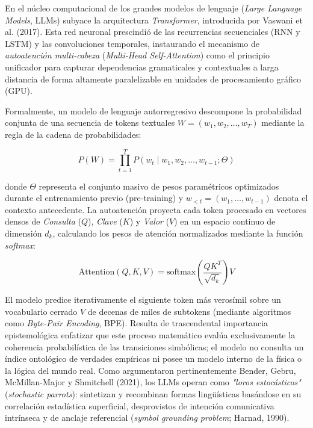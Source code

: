En el núcleo computacional de los grandes modelos de lenguaje (\textit{Large Language Models}, LLMs) subyace la arquitectura \textit{Transformer}, introducida por Vaswani et al. (2017). Esta red neuronal prescindió de las recurrencias secuenciales (RNN y LSTM) y las convoluciones temporales, instaurando el mecanismo de \textit{autoatención multi-cabeza} (\textit{Multi-Head Self-Attention}) como el principio unificador para capturar dependencias gramaticales y contextuales a larga distancia de forma altamente paralelizable en unidades de procesamiento gráfico (GPU).

Formalmente, un modelo de lenguaje autorregresivo descompone la probabilidad conjunta de una secuencia de tokens textuales $W = (w_1, w_2, \dots, w_T)$ mediante la regla de la cadena de probabilidades:

\begin{equation}
P(W) = \prod_{t=1}^T P(w_t \mid w_1, w_2, \dots, w_{t-1}; \Theta)
\end{equation}

\noindent donde $\Theta$ representa el conjunto masivo de pesos paramétricos optimizados durante el entrenamiento previo (pre-training) y $w_{<t} = (w_1, \dots, w_{t-1})$ denota el contexto antecedente. La autoatención proyecta cada token procesado en vectores densos de \textit{Consulta} ($Q$), \textit{Clave} ($K$) y \textit{Valor} ($V$) en un espacio continuo de dimensión $d_k$, calculando los pesos de atención normalizados mediante la función \textit{softmax}:

\begin{equation}
\text{Attention}(Q, K, V) = \text{softmax}\left(\frac{QK^T}{\sqrt{d_k}}\right)V
\end{equation}

El modelo predice iterativamente el siguiente token más verosímil sobre un vocabulario cerrado $V$ de decenas de miles de subtokens (mediante algoritmos como \textit{Byte-Pair Encoding}, BPE). Resulta de trascendental importancia epistemológica enfatizar que este proceso matemático evalúa exclusivamente la coherencia probabilística de las transiciones simbólicas; el modelo no consulta un índice ontológico de verdades empíricas ni posee un modelo interno de la física o la lógica del mundo real. Como argumentaron pertinentemente Bender, Gebru, McMillan-Major y Shmitchell (2021), los LLMs operan como \textit{"loros estocásticos"} (\textit{stochastic parrots}): sintetizan y recombinan formas lingüísticas basándose en su correlación estadística superficial, desprovistos de intención comunicativa intrínseca y de anclaje referencial (\textit{symbol grounding problem}; Harnad, 1990).

